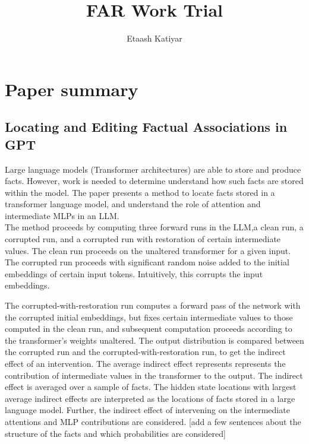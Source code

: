 \documentclass[10pt,a4paper]{report}
\author{Etaash Katiyar}
\title{FAR Work Trial}
\begin{document}
\section{Paper summary}
\subsection{Locating and Editing Factual Associations in GPT}


Large language models (Transformer architectures) are able to store and produce facts.
 However, work is needed to determine understand how such facts are stored within the model. 
The paper presents a method to locate facts stored in a transformer language model, and understand the role of attention and intermediate MLPs in an LLM.\\
The method proceeds by computing three forward runs in the LLM,a clean run, a corrupted run, and a corrupted run with restoration of certain intermediate values.
The clean run proceeds on the unaltered transformer for a given input.
The corrupted run proceeds with significant random noise added to the initial embeddings of certain input tokens.
Intuitively, this corrupts the input embeddings.

The corrupted-with-restoration run computes a forward pass of the network with the corrupted initial embeddings, but fixes certain intermediate values to those computed in the clean run, and subsequent computation proceeds according to the transformer's weights unaltered.
The output distribution is compared between the corrupted run and the corrupted-with-restoration run, to get the indirect effect of an intervention.
The average indirect effect represents represents the contribution of intermediate values in the transformer to the output.
The indirect effect is averaged over a sample of facts.
The hidden state locations with largest average indirect effects are interpreted as the locations of facts stored in a large language model.
Further, the indirect effect of intervening on the intermediate attentions and MLP contributions are considered. 
[add a few sentences about the structure of the facts and which probabilities are considered]
 \\
\end{document}

